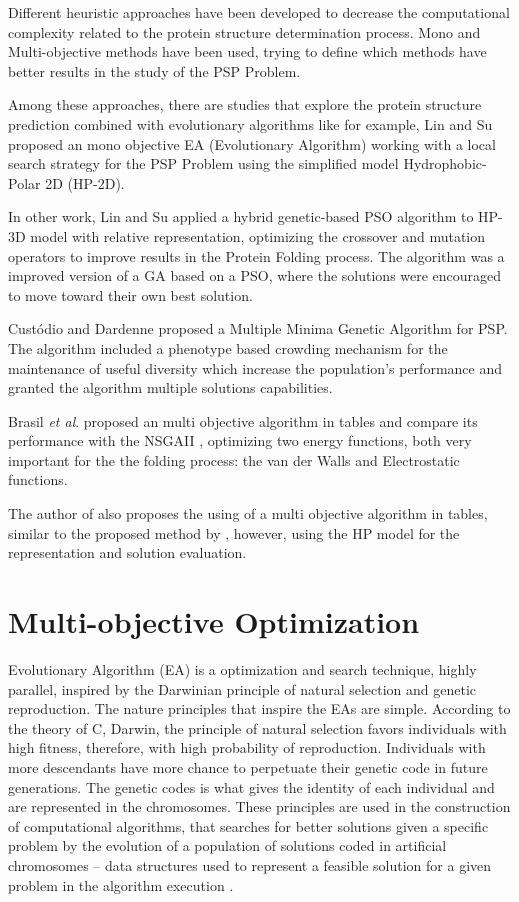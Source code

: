 Different heuristic approaches have been developed to decrease the computational complexity related to the protein structure determination process. Mono and Multi-objective methods have been used, trying to define which methods have better results in the study of the PSP Problem.


Among these approaches, there are studies that explore the protein structure prediction combined with evolutionary algorithms like for example, Lin and Su \cite{li2012genetic} proposed an mono objective EA (Evolutionary Algorithm) working with a local search strategy for the PSP Problem using the simplified model Hydrophobic-Polar 2D (HP-2D).


In other work, Lin and Su \cite{lin2011protein} applied a hybrid genetic-based PSO algorithm to HP-3D model with relative representation, optimizing the crossover and mutation operators to improve results in the Protein Folding process. The algorithm was a improved version of a GA based on a PSO, where the solutions were encouraged to move toward their own best solution.


Cust\'{o}dio and Dardenne \cite{custodio2014multiple} proposed a Multiple Minima Genetic Algorithm for PSP. The algorithm included a phenotype based crowding mechanism for the maintenance of useful diversity which increase the population's performance and granted the algorithm multiple solutions capabilities.


Brasil \textit{et al}.\cite{soares2011investigating} proposed an multi objective algorithm in tables and compare its performance with the NSGAII \cite{deb2002fast}, optimizing two energy functions, both very important for the the folding process: the van der Walls and Electrostatic functions.


The author of \cite{gabriel2012algoritmos} also proposes the using of a multi objective algorithm in tables, similar to the proposed method by \cite{soares2011investigating}, however, using the HP model for the representation and solution evaluation.


\section{Multi-objective Optimization} \label{sec:optimization}


Evolutionary Algorithm (EA) is a optimization and search technique, highly parallel, inspired by the Darwinian principle of natural selection and genetic reproduction. The nature principles that inspire the EAs are simple. According to the theory of C, Darwin, the principle of natural selection favors individuals with high fitness, therefore, with high probability of reproduction. Individuals with more descendants have more chance to perpetuate their genetic code in future generations. The genetic codes is what gives the identity of each individual and are represented in the chromosomes. These principles are used in the construction of computational algorithms, that searches for better solutions given a specific problem by the evolution of a population of solutions coded in artificial chromosomes -- data structures used to represent a feasible solution for a given problem in the algorithm execution \cite{pacheco1999algoritmos}.


